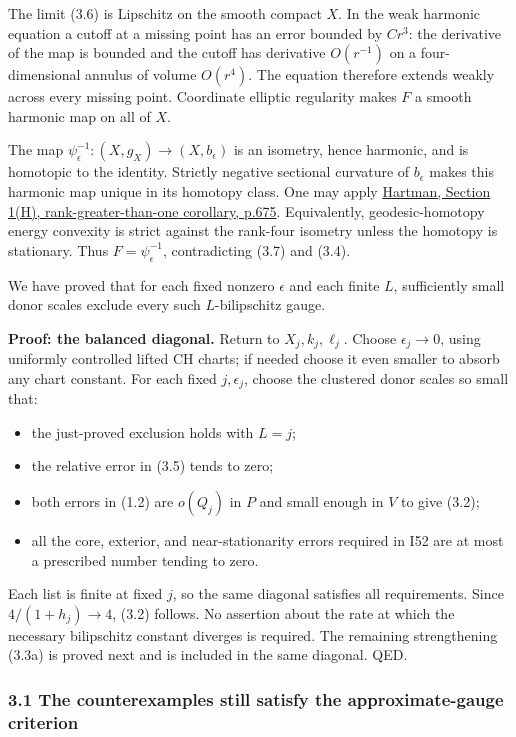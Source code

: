 \documentclass[
  11pt,
]{article}
\providecommand{\tightlist}{%
  \setlength{\itemsep}{0pt}\setlength{\parskip}{0pt}}
\begin{document}
The limit (3.6) is Lipschitz on the smooth compact \(X\). In the weak
harmonic equation a cutoff at a missing point has an error bounded by
\(C r^3\): the derivative of the map is bounded and the cutoff has
derivative \(O(r^{-1})\) on a four-dimensional annulus of volume
\(O(r^4)\). The equation therefore extends weakly across every missing
point. Coordinate elliptic regularity makes \(F\) a smooth harmonic map
on all of \(X\).

The map \(\psi_\epsilon^{-1}:(X,g_X)\to(X,b_\epsilon)\) is an isometry,
hence harmonic, and is homotopic to the identity. Strictly negative
sectional curvature of \(b_\epsilon\) makes this harmonic map unique in
its homotopy class. One may apply
\href{https://math.jhu.edu/~js/Math646/hartman.harmonic.pdf}{Hartman,
Section 1(H), rank-greater-than-one corollary, p.675}. Equivalently,
geodesic-homotopy energy convexity is strict against the rank-four
isometry unless the homotopy is stationary. Thus
\(F=\psi_\epsilon^{-1}\), contradicting (3.7) and (3.4).

We have proved that for each fixed nonzero \(\epsilon\) and each finite
\(L\), sufficiently small donor scales exclude every such
\(L\)-bilipschitz gauge.

\textbf{Proof: the balanced diagonal.} Return to \(X_j,k_j,\ell_j\).
Choose \(\epsilon_j\to0\), using uniformly controlled lifted CH charts;
if needed choose it even smaller to absorb any chart constant. For each
fixed \(j,\epsilon_j\), choose the clustered donor scales so small that:

\begin{itemize}
\tightlist
\item
  the just-proved exclusion holds with \(L=j\);
\item
  the relative error in (3.5) tends to zero;
\item
  both errors in (1.2) are \(o(Q_j)\) in \(P\) and small enough in \(V\)
  to give (3.2);
\item
  all the core, exterior, and near-stationarity errors required in I52
  are at most a prescribed number tending to zero.
\end{itemize}

Each list is finite at fixed \(j\), so the same diagonal satisfies all
requirements. Since \(4/(1+h_j)\to4\), (3.2) follows. No assertion about
the rate at which the necessary bilipschitz constant diverges is
required. The remaining strengthening (3.3a) is proved next and is
included in the same diagonal. QED.

\hypertarget{the-counterexamples-still-satisfy-the-approximate-gauge-criterion}{%
\subsubsection{3.1 The counterexamples still satisfy the
approximate-gauge
criterion}\label{the-counterexamples-still-satisfy-the-approximate-gauge-criterion}}
\end{document}
